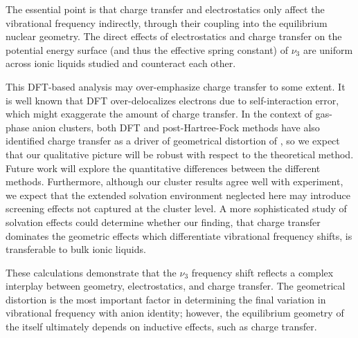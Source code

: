The essential point is that charge transfer and electrostatics only affect the vibrational frequency indirectly, through their coupling into the equilibrium  nuclear geometry. The direct effects of electrostatics and charge transfer on the potential energy surface (and thus the effective spring constant) of $\nu_3$ are uniform across ionic liquids studied and counteract each other.

This DFT-based analysis may over-emphasize charge transfer to some extent. It is well known that DFT over-delocalizes electrons due to self-interaction error, which might exaggerate the amount of charge transfer. In the context of gas-phase anion clusters, both DFT\cite{breen-JPCA12} and post-Hartree-Fock methods\cite{Muraoka2009} have also identified charge transfer as a driver of geometrical distortion of , so we expect that our qualitative picture will be robust with respect to the theoretical method. Future work will explore the quantitative differences between the different methods. Furthermore, although our cluster results agree well with experiment, we expect that the extended solvation environment neglected here may introduce screening effects not captured at the cluster level.\cite{Lee2011a}  A more sophisticated study of solvation effects could determine whether our finding, that charge transfer dominates the geometric effects which differentiate  vibrational frequency shifts, is transferable to bulk ionic liquids.

These calculations demonstrate that the $\nu_3$ frequency shift reflects a complex interplay between geometry, electrostatics, and charge transfer. The geometrical distortion is the most important factor in determining the final variation in vibrational frequency with anion identity; however, the equilibrium geometry of the  itself ultimately depends on inductive effects, such as charge transfer.


